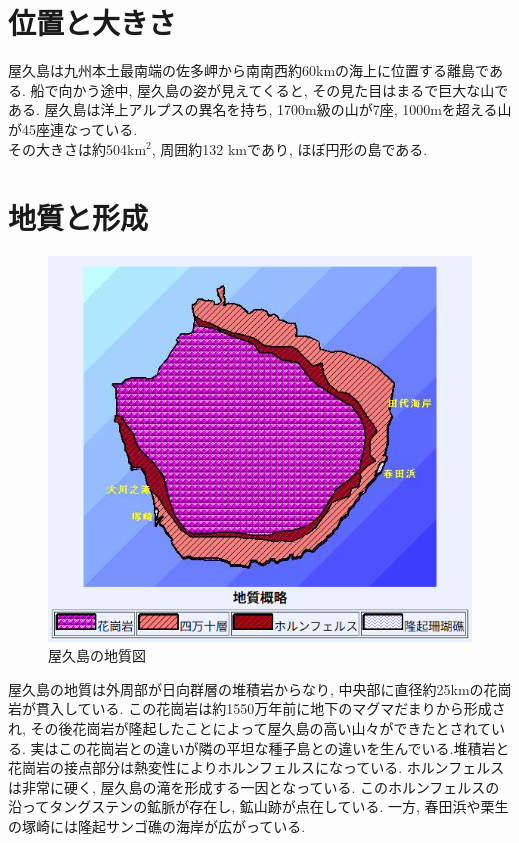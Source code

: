\documentclass[10pt,titlepage,a5paper]{ltjsbook}
\begin{document}
  \section{位置と大きさ}
    屋久島は九州本土最南端の佐多岬から南南西約60kmの海上に位置する離島である. 船で向かう途中, 屋久島の姿が見えてくると, その見た目はまるで巨大な山である. 屋久島は洋上アルプスの異名を持ち,
    1700m級の山が7座, 1000mを超える山が45座連なっている. \\
    その大きさは約504$\mathrm{km^2}$, 周囲約132 kmであり, ほぼ円形の島である.
  \section{地質と形成}
    \begin{minipage}{0.38\columnwidth}
      \begin{figure}[H]
        \centering
        \includegraphics[width=\columnwidth]{yakushima_geology.png}
        \caption{屋久島の地質図}
        \label{fig:yakushima_geology}
      \end{figure}
    \end{minipage}
    \hfill
    \begin{minipage}{0.58\columnwidth}
      屋久島の地質は外周部が日向群層の堆積岩からなり, 中央部に直径約25kmの花崗岩が貫入している. この花崗岩は約1550万年前に地下のマグマだまりから形成され, その後花崗岩が隆起したことによって屋久島の高い山々ができたとされている.
      実はこの花崗岩との違いが隣の平坦な種子島との違いを生んでいる.堆積岩と花崗岩の接点部分は熱変性によりホルンフェルスになっている. ホルンフェルスは非常に硬く, 屋久島の滝を形成する一因となっている.
      このホルンフェルスの沿ってタングステンの鉱脈が存在し, 鉱山跡が点在している.
      一方, 春田浜や栗生の塚崎には隆起サンゴ礁の海岸が広がっている.
    \end{minipage}
\end{document}
